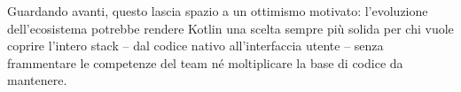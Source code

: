Guardando avanti, questo lascia spazio a un ottimismo motivato: l'evoluzione dell'ecosistema potrebbe rendere Kotlin una scelta sempre più solida per chi vuole coprire l'intero stack -- dal codice nativo all'interfaccia utente -- senza frammentare le competenze del team né moltiplicare la base di codice da mantenere.

